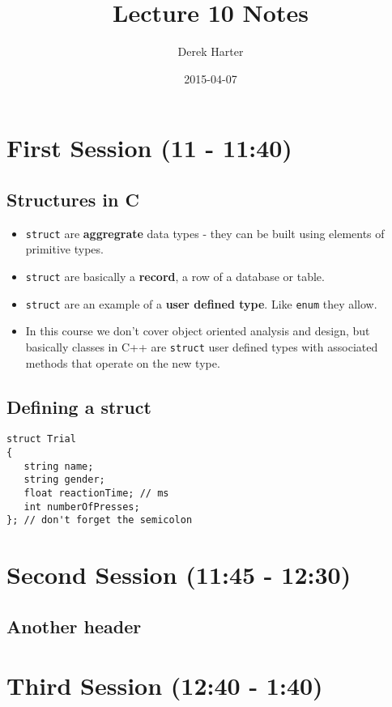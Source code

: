 \documentclass[11pt]{article}
\title{Lecture 10 Notes}
\author{Derek Harter}
\date{2015-04-07}
\begin{document}
\maketitle


\section{First Session (11 - 11:40)}
\label{sec-1}
\subsection{Structures in C}
\label{sec-1-1}

\begin{itemize}
\item \verb~struct~ are \textbf{aggregrate} data types - they can be built using
  elements of primitive types.
\item \verb~struct~ are basically a \textbf{record}, a row of a database or table.
\item \verb~struct~ are an example of a \textbf{user defined type}.  Like \verb~enum~ they
  allow.
\item In this course we don't cover object oriented analysis and design,
  but basically classes in C++ are \verb~struct~ user defined types with
  associated methods that operate on the new type.
\end{itemize}
\subsection{Defining a struct}
\label{sec-1-2}



\begin{verbatim}
struct Trial
{
   string name;
   string gender;
   float reactionTime; // ms
   int numberOfPresses;
}; // don't forget the semicolon
\end{verbatim}
\section{Second Session (11:45 - 12:30)}
\label{sec-2}
\subsection{Another header}
\label{sec-2-1}
\section{Third Session (12:40 - 1:40)}
\label{sec-3}
\end{document}
